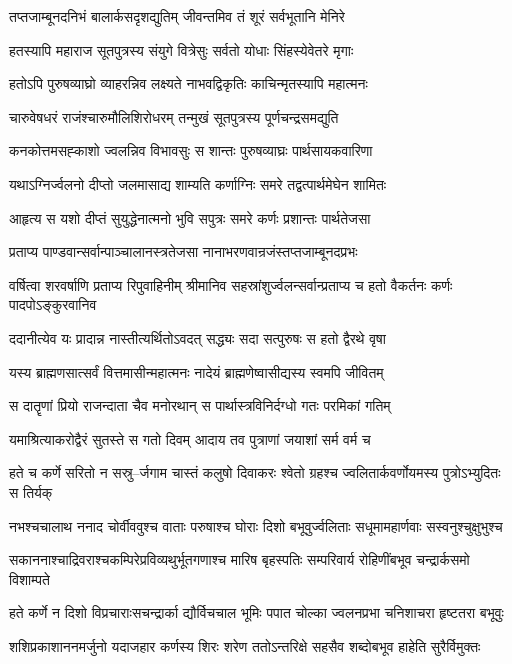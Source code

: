 \twolineshloka
{तप्तजाम्बूनदनिभं बालार्कसदृशद्युतिम्}
{जीवन्तमिव तं शूरं सर्वभूतानि मेनिरे}


\twolineshloka
{हतस्यापि महाराज सूतपुत्रस्य संयुगे}
{वित्रेसुः सर्वतो योधाः सिंहस्येवेतरे मृगाः}


\twolineshloka
{हतोऽपि पुरुषव्याघ्रो व्याहरन्निव लक्ष्यते}
{नाभवद्विकृतिः काचिन्मृतस्यापि महात्मनः}


\twolineshloka
{चारुवेषधरं राजंश्चारुमौलिशिरोधरम्}
{तन्मुखं सूतपुत्रस्य पूर्णचन्द्रसमद्युति}


\twolineshloka
{कनकोत्तमसह्काशो ज्वलन्निव विभावसुः}
{स शान्तः पुरुषव्याघ्रः पार्थसायकवारिणा}


\twolineshloka
{यथाऽग्निर्ज्वलनो दीप्तो जलमासाद्य शाम्यति}
{कर्णाग्निः समरे तद्वत्पार्थमेघेन शामितः}


\twolineshloka
{आहृत्य स यशो दीप्तं सुयुद्धेनात्मनो भुवि}
{सपुत्रः समरे कर्णः प्रशान्तः पार्थतेजसा}


\twolineshloka
{प्रताप्य पाण्डवान्सर्वान्पाञ्चालानस्त्रतेजसा}
{नानाभरणवान्रजंस्तप्तजाम्बूनदप्रभः}


\threelineshloka
{वर्षित्वा शरवर्षाणि प्रताप्य रिपुवाहिनीम्}
{श्रीमानिव सहस्रांशुर्ज्वलन्सर्वान्प्रताप्य च}
{हतो वैकर्तनः कर्णः पादपोऽङ्कुरवानिव}


\twolineshloka
{ददानीत्येव यः प्रादान्न नास्तीत्यर्थितोऽवदत्}
{सद्ध्यः सदा सत्पुरुषः स हतो द्वैरथे वृषा}


\twolineshloka
{यस्य ब्राह्मणसात्सर्वं वित्तमासीन्महात्मनः}
{नादेयं ब्राह्मणेष्वासीद्यस्य स्वमपि जीवितम्}


\twolineshloka
{स दातॄणां प्रियो राजन्दाता चैव मनोरथान्}
{स पार्थास्त्रविनिर्दग्धो गतः परमिकां गतिम्}


\twolineshloka
{यमाश्रित्याकरोद्वैरं सुतस्ते स गतो दिवम्}
{आदाय तव पुत्राणां जयाशां सर्म वर्म च}


\twolineshloka
{हते च कर्णे सरितो न सस्रु--र्जगाम चास्तं कलुषो दिवाकरः}
{श्वेतो ग्रहश्च ज्वलितार्कवर्णोयमस्य पुत्रोऽभ्युदितः स तिर्यक्}


\twolineshloka
{नभश्चचालाथ ननाद चोर्वीववुश्च वाताः परुषाश्च घोराः}
{दिशो बभूवुर्ज्वलिताः सधूमामहार्णवाः सस्वनुश्चुक्षुभुश्च}


\twolineshloka
{सकाननाश्चाद्रिवराश्चकम्पिरेप्रविव्यथुर्भूतगणाश्च मारिष}
{बृहस्पतिः सम्परिवार्य रोहिणींबभूव चन्द्रार्कसमो विशाम्पते}


\twolineshloka
{हते कर्णे न दिशो विप्रचाराःसचन्द्रार्का द्यौर्विचचाल भूमिः}
{पपात चोल्का ज्वलनप्रभा चनिशाचरा हृष्टतरा बभूवुः}


\twolineshloka
{शशिप्रकाशाननमर्जुनो यदाजहार कर्णस्य शिरः शरेण}
{ततोऽन्तरिक्षे सहसैव शब्दोबभूव हाहेति सुरैर्विमुक्तः}



